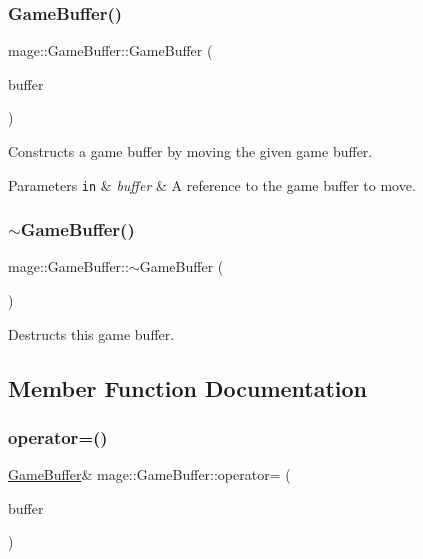 \subsubsection{\texorpdfstring{Game\+Buffer()}{GameBuffer()}\hspace{0.1cm}{\footnotesize\ttfamily [3/3]}}
{\footnotesize\ttfamily mage\+::\+Game\+Buffer\+::\+Game\+Buffer (\begin{DoxyParamCaption}\item[{\hyperlink{structmage_1_1_game_buffer}{Game\+Buffer} \&\&}]{buffer }\end{DoxyParamCaption})\hspace{0.3cm}{\ttfamily [default]}}

Constructs a game buffer by moving the given game buffer.


\begin{DoxyParams}[1]{Parameters}
\mbox{\tt in}  & {\em buffer} & A reference to the game buffer to move. \\
\hline
\end{DoxyParams}
\hypertarget{structmage_1_1_game_buffer_ac1ae097a91a446184b71bb4dd9acf8b4}{}\label{structmage_1_1_game_buffer_ac1ae097a91a446184b71bb4dd9acf8b4} 
\subsubsection{\texorpdfstring{$\sim$\+Game\+Buffer()}{~GameBuffer()}}
{\footnotesize\ttfamily mage\+::\+Game\+Buffer\+::$\sim$\+Game\+Buffer (\begin{DoxyParamCaption}{ }\end{DoxyParamCaption})\hspace{0.3cm}{\ttfamily [default]}}

Destructs this game buffer. 

\subsection{Member Function Documentation}
\hypertarget{structmage_1_1_game_buffer_aa21f68c930b1c180aaaeeee95854b021}{}\label{structmage_1_1_game_buffer_aa21f68c930b1c180aaaeeee95854b021} 
\subsubsection{\texorpdfstring{operator=()}{operator=()}\hspace{0.1cm}{\footnotesize\ttfamily [1/2]}}
{\footnotesize\ttfamily \hyperlink{structmage_1_1_game_buffer}{Game\+Buffer}\& mage\+::\+Game\+Buffer\+::operator= (\begin{DoxyParamCaption}\item[{const \hyperlink{structmage_1_1_game_buffer}{Game\+Buffer} \&}]{buffer }\end{DoxyParamCaption})\hspace{0.3cm}{\ttfamily [default]}}

